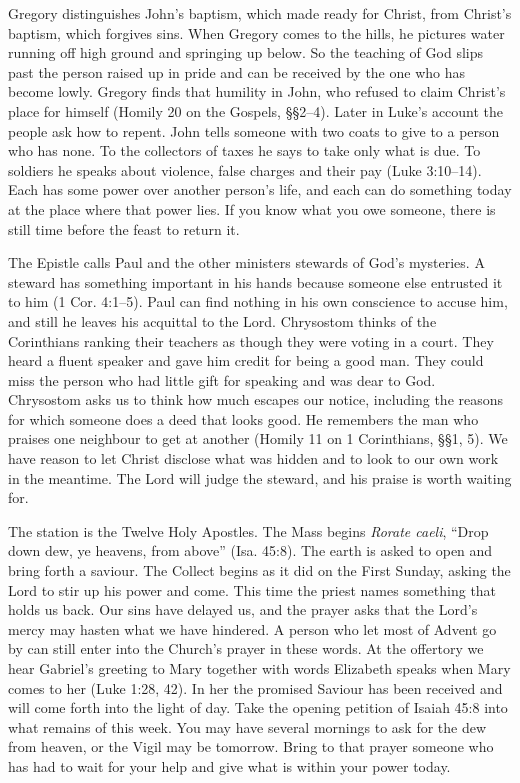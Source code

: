 Gregory distinguishes John's baptism, which made ready for Christ,
from Christ's baptism, which forgives sins. When Gregory comes to the
hills, he pictures water running off high ground and springing up
below. So the teaching of God slips past the person raised up in pride
and can be received by the one who has become lowly. Gregory finds
that humility in John, who refused to claim Christ's place for himself
(Homily 20 on the Gospels, §§2--4). Later in Luke's account the people
ask how to repent. John tells someone with two coats to give to a
person who has none. To the collectors of taxes he says to take only
what is due. To soldiers he speaks about violence, false charges
and their pay (Luke 3:10--14). Each has some power over another
person's life, and each can do something today at the place where
that power lies. If you know what you owe someone, there is still time
before the feast to return it.

The Epistle calls Paul and the other ministers stewards of God's
mysteries. A steward has something important in his hands because
someone else entrusted it to him (1 Cor. 4:1--5). Paul can find
nothing in his own conscience to accuse him, and still he leaves his
acquittal to the Lord. Chrysostom thinks of the Corinthians ranking
their teachers as though they were voting in a court. They heard a
fluent speaker and gave him credit for being a good man. They could
miss the person who had little gift for speaking and was dear to God.
Chrysostom asks us to think how much escapes our notice, including the
reasons for which someone does a deed that looks good. He remembers
the man who praises one neighbour to get at another (Homily 11 on
1 Corinthians, §§1, 5). We have reason to let Christ disclose what
was hidden and to look to our own work in the meantime. The Lord will judge the steward, and his praise is worth waiting for.

The station is the Twelve Holy Apostles. The Mass begins
\emph{Rorate caeli}, “Drop down dew, ye heavens, from above”
(Isa. 45:8). The earth is asked to open and bring forth a saviour.
The Collect begins as it did on the First Sunday, asking the Lord to
stir up his power and come. This time the priest names something that
holds us back. Our sins have delayed us, and the prayer asks that the
Lord's mercy may hasten what we have hindered. A person who let most of
Advent go by can still enter into the Church's prayer in these words.
At the offertory we
hear Gabriel's greeting to Mary together with words Elizabeth speaks
when Mary comes to her (Luke 1:28, 42). In her the promised Saviour
has been received and will come forth into the light of day. Take the
opening petition of Isaiah 45:8 into what remains of this week. You may
have several mornings to ask for the dew from heaven, or the Vigil
may be tomorrow. Bring to that prayer someone who has had to wait for
your help and give what is within your power today.
